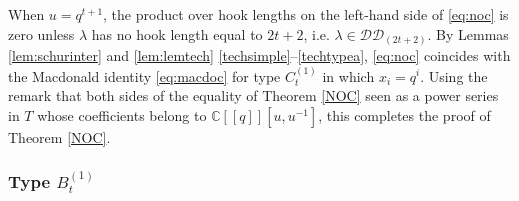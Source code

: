 \documentclass[11pt,letterpaper]{amsart}
\def\ccdd{\mathcal {DD}}
\numberwithin{equation}{section}
\numberwithin{df}{section}
\begin{document}
%


 







When $u=q^{t+1}$, the product over hook lengths on the left-hand side of \eqref{eq:noc} is zero unless $\lambda$ has no hook length equal to $2t+2$, i.e. $\lambda\in\ccdd_{(2t+2)}$. By Lemmas \ref{lem:schurinter} and \ref{lem:lemtech} \eqref{techsimple}--\eqref{techtypea}, \eqref{eq:noc} coincides with the Macdonald identity \eqref{eq:macdoc} for type $C^{(1)}_{t}$ in which $x_i=q^i$. Using the remark that both sides of the equality of Theorem \ref{NOC} seen as a power series in $T$ whose coefficients belong to $\mathbb{C}[[q]][u,u^{-1}]$, this completes the proof of Theorem \ref{NOC}.

\subsubsection{Type $B^{(1)}_{t}$}
\end{document}
